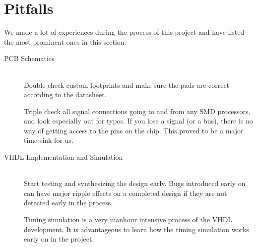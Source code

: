 
\section{Pitfalls}

We made a lot of experiences during the process of this project and have listed the most prominent ones in this section.

\begin{description}
   \item[PCB Schematics] \hfill \\
   Double check custom footprints and make sure the pads are correct according to the datasheet.

Triple check all signal connections going to and from any SMD processors, and look especially out for typos. If you lose a signal (or a bus), there is no way of getting access to the pins on the chip. This proved to be a major time sink for us.
   \item[VHDL Implementation and Simulation] \hfill \\
   Start testing and synthesizing the design early. Bugs introduced early on can have major ripple effects on a completed design if they are not detected early in the process.

Timing simulation is a very manhour intensive process of the VHDL development. It is advantageous to learn how the timing simulation works early on in the project.
\end{description}